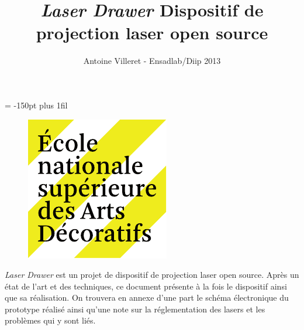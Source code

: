 \usepackage[utf8]{inputenc}
\usepackage[T1]{fontenc}
\usepackage{amsmath}
\usepackage{amsfonts}
\usepackage{amssymb}
\usepackage{graphicx} 
\usepackage{hyperref}
\usepackage{array}
\usepackage{eurosym}
\usepackage{caption}
\usepackage{subcaption}
\usepackage[title]{appendix}
\usepackage[a4paper,margin=5cm]{geometry}


\usepackage{textcomp}

\title{\textit{Laser Drawer} \vskip3pt
        \large Dispositif de projection laser open source}
\author{Antoine Villeret - Ensadlab/Diip 2013}

\makeatletter

\newskip\@bigflushglue \@bigflushglue = -150pt plus 1fil

\def\bigcenter{\trivlist \bigcentering\item\relax}
\def\bigcentering{\let\\\@centercr\rightskip\@bigflushglue%
\leftskip\@bigflushglue
\parindent\z@\parfillskip\z@skip}
\def\endbigcenter{\endtrivlist}

\makeatother

\newcommand{\unit}[1]{\ensuremath{\, \mathrm{#1}}}


        \begin{figure}
        \centering
        \includegraphics{images/EnsAD_logo.pdf}        
        \end{figure}

\maketitle
\tableofcontents
\vspace{2em}

\begin{fr}
\textit{Laser Drawer} est un projet de dispositif de projection laser open source. Après un état de l'art et des techniques, ce document présente à la fois le dispositif ainsi que sa réalisation. On trouvera en annexe d'une part le schéma électronique du prototype réalisé ainsi qu'une note sur la réglementation des lasers et les problèmes qui y sont liés.
\end{fr}

